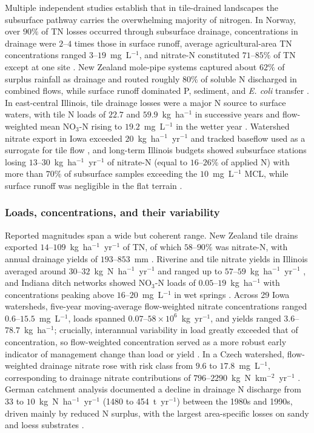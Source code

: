 \documentclass[11pt]{article}
\begin{document}
Multiple independent studies establish that in tile-drained landscapes
the subsurface pathway carries the overwhelming majority of nitrogen.
In Norway, over $90\%$ of TN losses occurred through subsurface drainage,
concentrations in drainage were $2$--$4$ times those in surface runoff,
average agricultural-area TN concentrations ranged $3$--$19$~mg~L$^{-1}$,
and nitrate-N constituted $71$--$85\%$ of TN except at one site
\parencite{Bechmann2014}. New Zealand mole-pipe systems captured about
$62\%$ of surplus rainfall as drainage and routed roughly $80\%$ of
soluble N discharged in combined flows, while surface runoff dominated
P, sediment, and \emph{E. coli} transfer \parencite{Monaghan2016}. In
east-central Illinois, tile drainage losses were a major N source to
surface waters, with tile N loads of $22.7$ and $59.9$~kg~ha$^{-1}$ in
successive years and flow-weighted mean NO$_3$-N rising to $19.2$~mg~L$^{-1}$
in the wetter year \parencite{Gentry2009}. Watershed nitrate export in
Iowa exceeded $20$~kg~ha$^{-1}$~yr$^{-1}$ and tracked baseflow used as a
surrogate for tile flow \parencite{Tomer2008}, and long-term Illinois
budgets showed subsurface stations losing $13$--$30$~kg~ha$^{-1}$~yr$^{-1}$
of nitrate-N (equal to $16$--$26\%$ of applied N) with more than $70\%$ of
subsurface samples exceeding the $10$~mg~L$^{-1}$ MCL, while surface runoff
was negligible in the flat terrain \parencite{Dattamudi2020}.

\subsubsection{Loads, concentrations, and their variability}

Reported magnitudes span a wide but coherent range. New Zealand tile
drains exported $14$--$109$~kg~ha$^{-1}$~yr$^{-1}$ of TN, of which
$58$--$90\%$ was nitrate-N, with annual drainage yields of $193$--$853$~mm
\parencite{Tanner2011}. Riverine and tile nitrate yields in Illinois
averaged around $30$--$32$~kg~N~ha$^{-1}$~yr$^{-1}$ and ranged up to
$57$--$59$~kg~ha$^{-1}$~yr$^{-1}$ \parencite{Gentry2014}, and Indiana ditch
networks showed NO$_3$-N loads of $0.05$--$19$~kg~ha$^{-1}$ with
concentrations peaking above $16$--$20$~mg~L$^{-1}$ in wet springs
\parencite{Smith2008}. Across 29 Iowa watersheds, five-year moving-average
flow-weighted nitrate concentrations ranged $0.6$--$15.5$~mg~L$^{-1}$,
loads spanned $0.07$--$58\times10^{6}$~kg~yr$^{-1}$, and yields ranged
$3.6$--$78.7$~kg~ha$^{-1}$; crucially, interannual variability in load
greatly exceeded that of concentration, so flow-weighted concentration
served as a more robust early indicator of management change than load or
yield \parencite{Danalatos2022}. In a Czech watershed, flow-weighted
drainage nitrate rose with risk class from $9.6$ to $17.8$~mg~L$^{-1}$,
corresponding to drainage nitrate contributions of $796$--$2290$~kg~N~km$^{-2}$~yr$^{-1}$
\parencite{Kvítek2023}. German catchment analysis documented a decline in
drainage N discharge from $33$ to $10$~kg~N~ha$^{-1}$~yr$^{-1}$ (1480 to
454~t~yr$^{-1}$) between the 1980s and 1990s, driven mainly by reduced N
surplus, with the largest area-specific losses on sandy and loess
substrates \parencite{Hirt2005b}.
\end{document}

